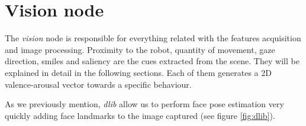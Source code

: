\begin{figure}[h!]
\end{figure}

\section{Vision node}
The \textit{vision} node is responsible for everything related with the features acquisition and image processing. Proximity to the robot, quantity of movement, gaze direction, smiles and saliency are the cues extracted from the scene. They will be explained in detail in the following sections. Each of them generates a 2D valence-arousal vector towards a specific behaviour.

As we previously mention, \textit{dlib} allow us to perform face pose estimation very quickly adding face landmarks to the image captured (see figure \ref{fig:dlib}).


